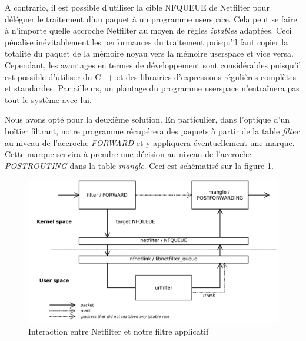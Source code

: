 A contrario, il est possible d'utiliser la cible NFQUEUE de Netfilter
pour déléguer le traitement d'un paquet à un programme userspace. Cela
peut se faire à n'importe quelle accroche Netfilter au moyen de règles
\textit{iptables} adaptées. Ceci pénalise inévitablement les
performances du traitement puisqu'il faut copier la totalité du paquet
de la mémoire noyau vers la mémoire userspace et vice
versa. Cependant, les avantages en termes de développement sont
considérables puisqu'il est possible d'utiliser du C++ et des
librairies d'expressions régulières complètes et standardes. Par
ailleurs, un plantage du programme userspace n'entraînera pas tout le
système avec lui.

Nous avons opté pour la deuxième solution. En particulier, dans
l'optique d'un boîtier filtrant, notre programme récupérera des
paquets à partir de la table \textit{filter} au niveau de l'accroche
\textit{FORWARD} et y appliquera éventuellement une marque. Cette
marque servira à prendre une décision au niveau de l'accroche
\textit{POSTROUTING} dans la table \textit{mangle}. Ceci est
schématisé sur la figure \ref{schema1}.

\begin{figure}[h]
  \begin{center}
    \includegraphics[scale=0.2]{schema1.png}
    \caption{Interaction entre Netfilter et notre filtre applicatif}
    \label{schema1}
  \end{center}
\end{figure}
